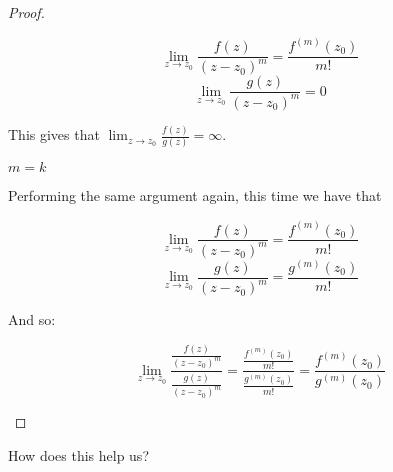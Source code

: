 \begin{proof}
\begin{case}
$$\lim_{z\rightarrow z_0} \frac{f(z)}{(z-z_0)^m} = \frac{f^{(m)}(z_0)}{m!}$$
$$\lim_{z\rightarrow z_0} \frac{g(z)}{(z-z_0)^m} = 0$$

This gives that $\lim_{z\rightarrow z_0}\frac{f(z)}{g(z)} = \infty$.
\end{case}

\begin{case}$m = k$

Performing the same argument again, this time we have that

$$\lim_{z\rightarrow z_0} \frac{f(z)}{(z-z_0)^m} = \frac{f^{(m)}(z_0)}{m!}$$
$$\lim_{z\rightarrow z_0} \frac{g(z)}{(z-z_0)^m} = \frac{g^{(m)}(z_0)}{m!}$$

And so:

$$\lim_{z\rightarrow z_0} \frac{\frac{f(z)}{(z-z_0)^m}}{\frac{g(z)}{(z-z_0)^m}} = \frac{\frac{f^{(m)}(z_0)}{m!}}{\frac{g^{(m)}(z_0)}{m!}} = \frac{f^{(m)}(z_0)}{g^{(m)}(z_0)}$$

\end{case}

\end{proof}

How does this help us?

